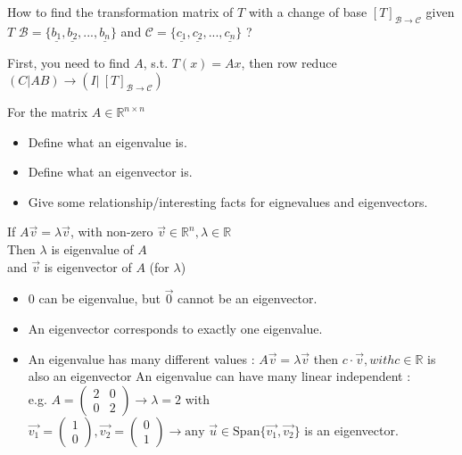 \documentclass[12pt]{article}
\newcommand*{\xfield}[1]{\begin{mdframed}\centering #1\end{mdframed}\bigskip}
\newenvironment{note}{}{}
\begin{document}
\begin{note}
	\xfield{How to find the transformation matrix of $T$ with a change of base $[T]_{\mathcal{B}\rightarrow\mathcal{C}}$ given $T$ $\mathcal{B} = \{ \underline{b_1},\underline{b_2},...,\underline{b_n}\}$ and $\mathcal{C} = \{ \underline{c_1},\underline{c_2},...,\underline{c_n}\}$ ?}
	\xfield{First, you need to find $A$, s.t. $T(x) = Ax$, then row reduce $(C|AB) \rightarrow (I|\ [T]_{\mathcal{B}\rightarrow\mathcal{C}})$ }
\end{note}

\begin{note}
	\xfield{For the matrix $A \in \mathbb{R}^{n\times n}$\\
	 \begin{itemize}
	 	 \item Define what an eigenvalue is.
	\item Define what an eigenvector is.
	\item Give some relationship/interesting facts for eignevalues and eigenvectors.
	 \end{itemize} }
	\xfield{If $A\vec{v} = \lambda \vec{v}$, with non-zero $\vec{v} \in \mathbb{R}^n, \lambda \in \mathbb{R}$ \\
	Then $\lambda$ is eigenvalue of $A$\\
	and $\vec{v}$ is eigenvector of $A$ (for $\lambda$) \\
	\begin{itemize}
		\item $0$ can be eigenvalue, but $\vec{0}$ cannot be an eigenvector.
		\item An eigenvector corresponds to exactly one eigenvalue.
		\item An eigenvalue has many different values :
			\subitem $A\vec{v} = \lambda \vec{v}$  then $c\cdot \vec{v}, with c \in \mathbb{R}$ is also an eigenvector
			\subitem An eigenvalue can have many linear independent : \\
			e.g. $A = \begin{pmatrix}
			2&0\\
			0&2
			\end{pmatrix} \rightarrow \lambda = 2$ with $\vec{v_1}=\begin{pmatrix}
			1\\
			0
			\end{pmatrix},\vec{v_2} = \begin{pmatrix}
			0\\
			1
			\end{pmatrix} \rightarrow \text{any } \vec{u} \in \text{Span}\{\vec{v_1},\vec{v_2} \}$ is an eigenvector.

\end{itemize}}
\end{note}
\end{document}
